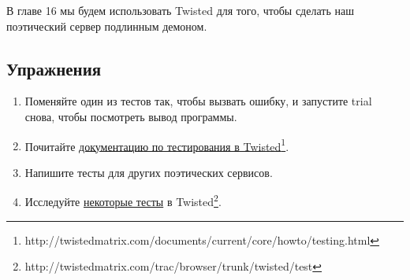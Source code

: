 В главе 16 мы будем использовать Twisted для того, чтобы 
сделать наш поэтический сервер подлинным демоном.

\subsection{Упражнения}

\begin{enumerate}

\item Поменяйте один из тестов так, чтобы вызвать ошибку, и 
запустите trial снова, чтобы посмотреть вывод программы.

\item Почитайте \href{http://twistedmatrix.com/documents/current/core/howto/testing.html}{документацию по тестирования в Twisted}\footnote[1]{http://twistedmatrix.com/documents/current/core/howto/testing.html}.

\item Напишите тесты для других поэтических сервисов.

\item Исследуйте \href{http://twistedmatrix.com/trac/browser/trunk/twisted/test}{некоторые тесты} в 
Twisted\footnote{http://twistedmatrix.com/trac/browser/trunk/twisted/test}.

\end{enumerate}

